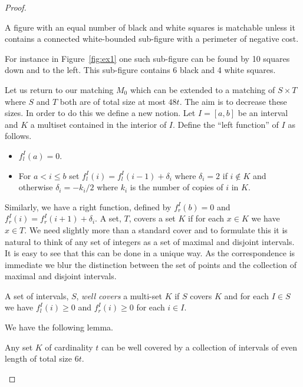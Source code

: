 \documentclass{article}\usepackage[a4paper,margin=20mm]{geometry}
\begin{document}
\begin{proof}
\begin{lemma}\label{lemma:nomatch}
A figure with an equal number of black and white squares
is matchable unless it contains
a connected white-bounded sub-figure with a perimeter
of negative cost.
\end{lemma}

For instance in Figure~\ref{fig:ex1} one such sub-figure
can be found by 10 squares down and to the left.
This sub-figure contains 6 black and 4 white
squares.

Let us return to our matching $M_0$
which can be extended to a matching of $S \times T$
where $S$ and $T$ both are of total size 
at most $48t$.  The aim is to decrease these sizes.
In order to do this we define a new notion.  Let
$I= [a,b]$ be an interval and $K$ a multiset contained
in the interior of $I$.  Define the ``left function'' of
$I$ as follows.

\begin{itemize}

\item $f^I_l(a)=0$.

\item For $a < i \leq b$ set $f^I_l (i) = f^I_l(i-1)+\delta_i$ where
$\delta_i = 2$ if $i \not \in K$ and otherwise $\delta_i = -k_i/2$ where
$k_i$ is the number of copies of $i$ in $K$.

\end{itemize}

Similarly, we have a right function, defined by $f^I_r(b)=0$ and
$f^I_r(i)=f^I_r(i+1)+\delta_i$.   A set, $T$,
covers a set $K$ if for each $x\in K$ we have $x\in T$.  
We need slightly more than a standard cover and to formulate
this it is natural to think of any set of integers as
a set of maximal and disjoint intervals.  It is easy to
see that this can be done in a unique way.  As the correspondence
is immediate we blur the distinction between the set of points
and the collection of maximal and disjoint intervals.

\begin{definition}
A set of intervals, $S$,
{\em well covers} a multi-set $K$
if $S$ covers $K$ and for each $I\in S$ 
we have $f_l^I (i) \geq 0$ and $f_r^I (i) \geq 0$ for
each $i \in I$.
\end{definition}

We have the following lemma. 
\begin{lemma} \label{lemma:wellcover}
Any set $K$ of cardinality $t$ can be well covered by
a collection of intervals of even length of total size
$6t$.
\end{lemma}


\end{proof}
\end{document}
